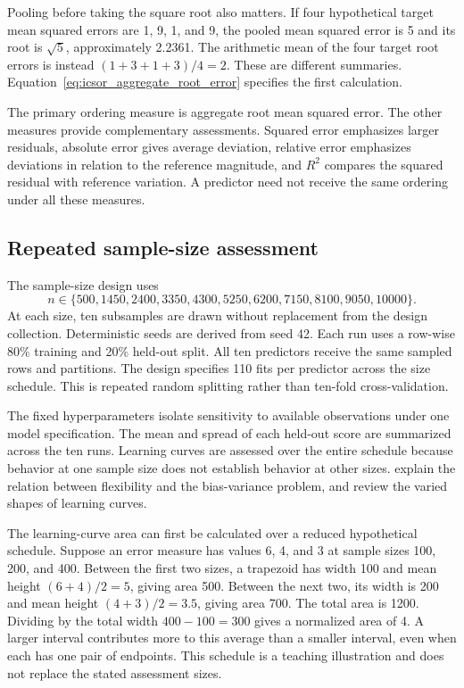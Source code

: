 Pooling before taking the square root also matters. If four hypothetical target mean squared errors are 1, 9, 1, and 9, the pooled mean squared error is 5 and its root is \(\sqrt5\), approximately 2.2361. The arithmetic mean of the four target root errors is instead \((1+3+1+3)/4=2\). These are different summaries. Equation~\eqref{eq:icsor_aggregate_root_error} specifies the first calculation.

The primary ordering measure is aggregate root mean squared error. The other measures provide complementary assessments. Squared error emphasizes larger residuals, absolute error gives average deviation, relative error emphasizes deviations in relation to the reference magnitude, and \(R^2\) compares the squared residual with reference variation. A predictor need not receive the same ordering under all these measures.

\subsection{Repeated sample-size assessment}

The sample-size design uses
\begin{equation}
\label{eq:icsor_assessment_sizes}
n\in\{500,1450,2400,3350,4300,5250,6200,7150,8100,9050,10000\}.
\end{equation}
At each size, ten subsamples are drawn without replacement from the design collection. Deterministic seeds are derived from seed 42. Each run uses a row-wise 80\% training and 20\% held-out split. All ten predictors receive the same sampled rows and partitions. The design specifies 110 fits per predictor across the size schedule. This is repeated random splitting rather than ten-fold cross-validation.

The fixed hyperparameters isolate sensitivity to available observations under one model specification. The mean and spread of each held-out score are summarized across the ten runs. Learning curves are assessed over the entire schedule because behavior at one sample size does not establish behavior at other sizes. \citet{Geman1992} explain the relation between flexibility and the bias-variance problem, and \citet{VieringLoog2023} review the varied shapes of learning curves.

The learning-curve area can first be calculated over a reduced hypothetical schedule. Suppose an error measure has values 6, 4, and 3 at sample sizes 100, 200, and 400. Between the first two sizes, a trapezoid has width 100 and mean height \((6+4)/2=5\), giving area 500. Between the next two, its width is 200 and mean height \((4+3)/2=3.5\), giving area 700. The total area is 1200. Dividing by the total width \(400-100=300\) gives a normalized area of 4. A larger interval contributes more to this average than a smaller interval, even when each has one pair of endpoints. This schedule is a teaching illustration and does not replace the stated assessment sizes.

